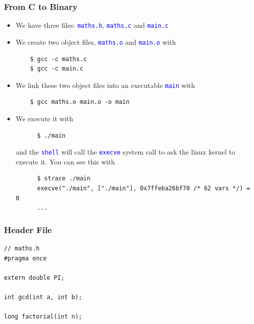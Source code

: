 \documentclass{beamer}
\begin{document}
\begin{frame}[fragile]
\frametitle{From C to Binary}

\scriptsize

\begin{itemize}

\item We have three files: \texttt{\textcolor{blue}{maths.h}}, \texttt{\textcolor{blue}{maths.c}} and \texttt{\textcolor{blue}{main.c}}

  \vspace{0.5cm}

\item We create two object files, \texttt{\textcolor{blue}{maths.o}} and \texttt{\textcolor{blue}{main.o}} with
  \begin{Verbatim}
    $ gcc -c maths.c
    $ gcc -c main.c
  \end{Verbatim}

  \vspace{0.5cm}

\item We link these two object files into an executable \texttt{\textcolor{blue}{main}} with
  \begin{Verbatim}
    $ gcc maths.o main.o -o main
  \end{Verbatim}
  \vspace{0.5cm}

\item We execute it with
    \begin{Verbatim}
      $ ./main
    \end{Verbatim}
  \vspace{0.1cm}

    and the \texttt{\textcolor{blue}{shell}} will call the \texttt{\textcolor{blue}{execve}} system call to ask the linux kernel to
    execute it. You can see this with
    \begin{Verbatim}
      $ strace ./main
      execve("./main", ["./main"], 0x7ffeba26bf70 /* 62 vars */) = 0
      ...
    \end{Verbatim}

\end{itemize}

\end{frame}

\lstset{language = c++, frameround = fttt, frame=trBL}

\begin{frame}[fragile]
\frametitle{Header File}
\scriptsize
\begin{lstlisting}
// maths.h
#pragma once

extern double PI;

int gcd(int a, int b);

long factorial(int n);
\end{lstlisting}

\end{frame}
\end{document}
